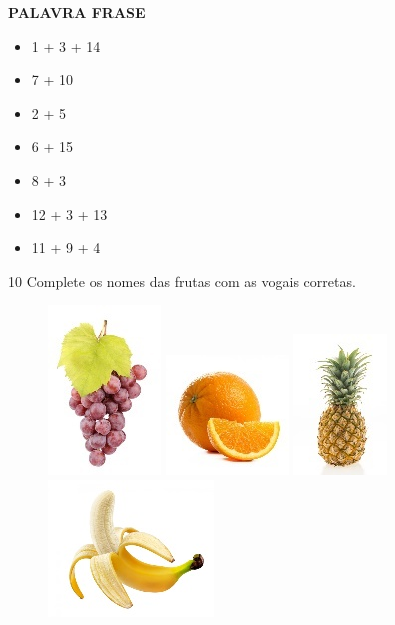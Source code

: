 \textbf{PALAVRA FRASE}

\begin{itemize}
\item 1 + 3 + 14 \reduline{\mbox{ }\hfill}

\item 7 + 10 \reduline{\mbox{ }\hfill}

\item 2 + 5 \reduline{\mbox{ }\hfill}

\item 6 + 15 \reduline{\mbox{ }\hfill}

\item 8 + 3 \reduline{\mbox{ }\hfill}

\item 12 + 3 + 13 \reduline{\mbox{ }\hfill}

\item 11 + 9 + 4 \reduline{\mbox{ }\hfill}
\end{itemize}

\num{10} Complete os nomes das frutas com as vogais corretas.


\begin{figure}[htpb!]
\includegraphics[width=.24\textwidth]{media/image69.jpeg}
\includegraphics[width=.24\textwidth]{media/image70.jpeg}
\includegraphics[width=.24\textwidth]{media/image71.jpeg}
\includegraphics[width=.24\textwidth]{media/image72.jpeg}
\end{figure}

